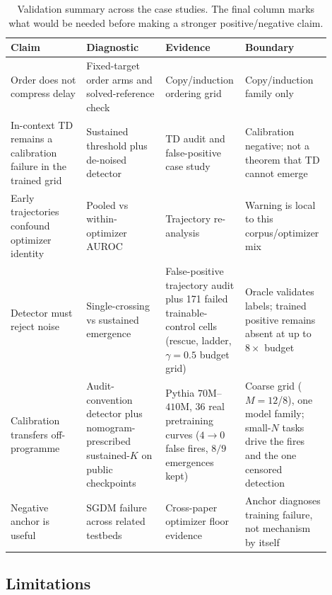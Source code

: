 \documentclass[11pt]{article}
\theoremstyle{plain}
\theoremstyle{definition}
\begin{document}
\begin{table}[htbp]
\centering
\caption{Validation summary across the case studies. The final column
marks what would be needed before making a stronger positive/negative claim.}
\label{tab:evidence-ledger}
\scriptsize
\begin{tabular}{@{}>{\raggedright\arraybackslash}p{0.23\linewidth}>{\raggedright\arraybackslash}p{0.24\linewidth}>{\raggedright\arraybackslash}p{0.18\linewidth}>{\raggedright\arraybackslash}p{0.25\linewidth}@{}}
\toprule
Claim & Diagnostic & Evidence & Boundary \\
\midrule
Order does not compress delay & Fixed-target order arms and solved-reference check & Copy/induction ordering grid & Copy/induction family only \\
In-context TD remains a calibration failure in the trained grid & Sustained threshold plus de-noised detector & TD audit and false-positive case study & Calibration negative; not a theorem that TD cannot emerge \\
Early trajectories confound optimizer identity & Pooled vs within-optimizer AUROC & Trajectory re-analysis & Warning is local to this corpus/optimizer mix \\
Detector must reject noise & Single-crossing vs sustained emergence & False-positive trajectory audit plus 171 failed trainable-control cells (rescue, ladder, $\gamma=0.5$ budget grid) & Oracle validates labels; trained positive remains absent at up to $8\times$ budget \\
Calibration transfers off-programme & Audit-convention detector plus nomogram-prescribed sustained-$K$ on public checkpoints & Pythia $70$M--$410$M, $36$ real pretraining curves ($4\to0$ false fires, $8/9$ emergences kept) & Coarse grid ($M{=}12$/$8$), one model family; small-$N$ tasks drive the fires and the one censored detection \\
Negative anchor is useful & SGDM failure across related testbeds & Cross-paper optimizer floor evidence & Anchor diagnoses training failure, not mechanism by itself \\
\bottomrule
\end{tabular}
\end{table}

\subsection{Limitations}\label{sec:limitations}
\end{document}
